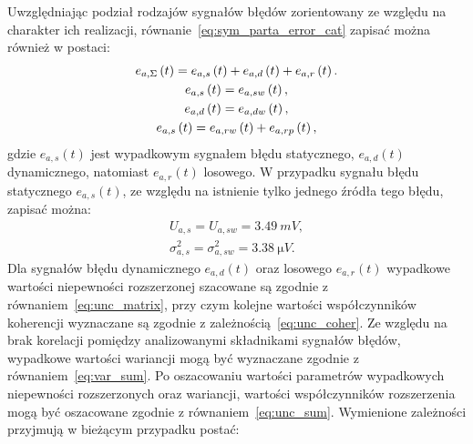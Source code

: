 Uwzględniając podział rodzajów sygnałów błędów zorientowany ze względu na charakter ich realizacji, równanie~\eqref{eq:sym_parta_error_cat} zapisać można również w postaci:
\begin{gather}
e_{a,\Sigma} \left(t\right) = e_{a,s} \left(t\right) + e_{a,d} \left(t\right) + e_{a,r} \left(t\right) \label{eq:sym_parta_error_cat}. \\
e_{a,s} \left(t\right) = e_{a,sw} \left(t\right) \label{eq:sym_parta_error_stat}, \\
e_{a,d} \left(t\right) = e_{a,dw} \left(t\right) \label{eq:sym_parta_error_dyn}, \\
e_{a,s} \left(t\right) = e_{a,rw} \left(t\right) + e_{a,rp} \left(t\right) \label{eq:sym_parta_error_rand},
\end{gather}
gdzie $e_{a,s}(t)$ jest wypadkowym sygnałem błędu statycznego, $e_{a,d}(t)$ dynamicznego, natomiast $e_{a,r}(t)$ losowego. W przypadku sygnału błędu statycznego $e_{a,s}(t)$, ze względu na istnienie tylko jednego źródła tego błędu, zapisać można:
\begin{gather}
U_{a,s} = U_{a,sw} = \qty{3.49}{mV} \label{eq:sym_parta_uncert_stat}, \\
\sigma_{a,s}^{2} = \sigma_{a,sw}^{2} = \qty{3.38}{\micro V} \label{eq:sym_parta_var_stat}.
\end{gather}
Dla sygnałów błędu dynamicznego $e_{a,d}(t)$ oraz losowego $e_{a,r}(t)$ wypadkowe wartości niepewności rozszerzonej szacowane są zgodnie z równaniem~\eqref{eq:unc_matrix}, przy czym kolejne wartości współczynników koherencji wyznaczane są zgodnie z zależnością~\eqref{eq:unc_coher}. Ze względu na brak korelacji pomiędzy analizowanymi składnikami sygnałów błędów, wypadkowe wartości wariancji mogą być wyznaczane zgodnie z równaniem~\eqref{eq:var_sum}. Po oszacowaniu wartości parametrów wypadkowych niepewności rozszerzonych oraz wariancji, wartości współczynników rozszerzenia mogą być oszacowane zgodnie z równaniem~\eqref{eq:unc_sum}. Wymienione zależności przyjmują w bieżącym przypadku postać:
